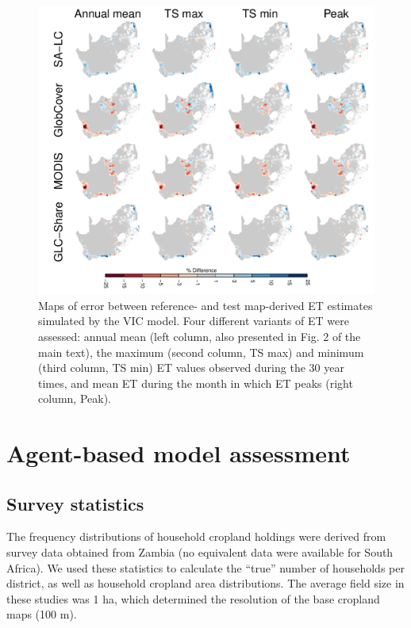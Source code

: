 \documentclass[12pt, titlepage]{article}
\begin{document}
\begin{figure}[ht]
  \centering
     \includegraphics[width = 12cm]{figures/et_bias_map4.pdf} 
      \caption{Maps of error between reference- and test map-derived ET estimates simulated by the VIC model. Four different variants of ET were assessed: annual mean (left column, also presented in Fig. 2 of the main text), the maximum (second column, TS max) and minimum (third column, TS min) ET values observed during the 30 year times, and mean ET during the month in which ET peaks (right column, Peak).}
      \label{fig:et}
\end{figure}


\section{\large Agent-based model assessment}

\subsection{\large Survey statistics}
The frequency distributions of household cropland holdings were derived from survey data obtained from Zambia (no equivalent data were available for South Africa). We used these statistics to calculate the ``true'' number of households per district, as well as household cropland area distributions. The average field size in these studies was 1 ha, which determined the resolution of the base cropland maps (100 m). 
\end{document}
